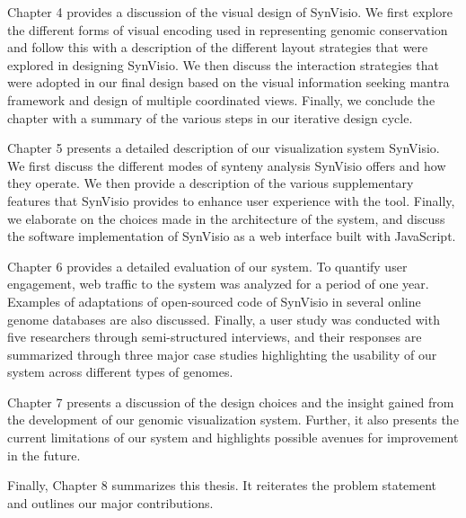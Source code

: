  Chapter 4 provides a discussion of the visual design of SynVisio. We first explore the different forms of visual encoding used in representing genomic conservation and follow this with a description of the different layout strategies that were explored in designing SynVisio. We then discuss the interaction strategies that were adopted in our final design based on the visual information seeking mantra framework and design of multiple coordinated views. Finally, we conclude the chapter with a summary of the various steps in our iterative design cycle.

Chapter 5 presents a detailed description of our visualization system SynVisio. We first discuss the different modes of synteny analysis SynVisio offers and how they operate. We then provide a description of the various supplementary features that SynVisio provides to enhance user experience with the tool. Finally, we elaborate on the choices made in the architecture of the system,
and discuss the software implementation of SynVisio as a web interface built with JavaScript.

Chapter 6 provides a detailed evaluation of our system. To quantify user engagement, web traffic to the system was analyzed for a period of one year. Examples of adaptations of open-sourced code of SynVisio in several online genome databases are also discussed. Finally, a user study was conducted with five researchers through semi-structured interviews, and their responses are summarized through three major case studies highlighting the usability of our system across different types of genomes.

Chapter 7 presents a discussion of the design choices and the insight gained from the development of our genomic visualization system. Further, it also presents the current limitations of our system and highlights possible avenues for improvement in the future.

Finally, Chapter 8 summarizes this thesis. It reiterates the problem statement and outlines our major contributions.